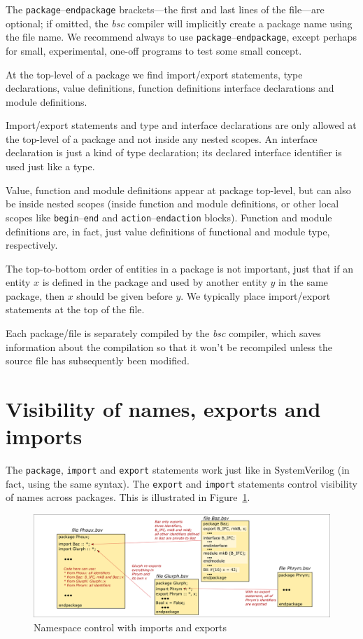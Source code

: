 The \verb|package|--\verb|endpackage| brackets---the first and last
lines of the file---are optional; if omitted, the \emph{bsc} compiler
will implicitly create a package name using the file name.  We
recommend always to use \verb|package|--\verb|endpackage|, except
perhaps for small, experimental, one-off programs to test some small
concept.

At the top-level of a package we find import/export statements, type
declarations, value definitions, function definitions interface
declarations and module definitions.

Import/export statements and type and interface declarations are only
allowed at the top-level of a package and not inside any nested
scopes.  An interface declaration is just a kind of type declaration;
its declared interface identifier is used just like a type.

Value, function and module definitions appear at package top-level,
but can also be inside nested scopes (inside function and module
definitions, or other local scopes like \verb|begin|--\verb|end| and
\verb|action|--\verb|endaction| blocks).  Function and module
definitions are, in fact, just value definitions of functional and
module type, respectively.

The top-to-bottom order of entities in a package is not important,
just that if an entity $x$ is defined in the package and used by
another entity $y$ in the same package, then $x$ should be given
before $y$.  We typically place import/export statements at the top of
the file.

Each package/file is separately compiled by the \emph{bsc} compiler,
which saves information about the compilation so that it won't be
recompiled unless the source file has subsequently been modified.


\section{Visibility of names, exports and imports}

The \verb|package|, \verb|import| and \verb|export| statements work
just like in SystemVerilog (in fact, using the same syntax).  The
\verb|export| and \verb|import| statements control visibility of names
across packages.  This is illustrated in Figure~\ref{Fig_BSV_namespace_control}.
\begin{figure}[htbp]
  \centerline{\includegraphics[width=6in,angle=0]{Figures/Fig_BSV_namespace_control}}
  \caption{\label{Fig_BSV_namespace_control}
           Namespace control with imports and exports}
\end{figure}

